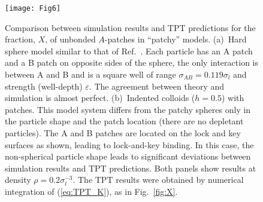 \documentclass[10pt,onside,singlecolumn]{article}
\begin{document}
\begin{figure} 
  \texttt{[image: Fig6]}
  \caption{Comparison between simulation results and TPT predictions for the fraction, $X$, of unbonded $A$-patches in
  ``patchy'' models.  (a)~Hard sphere 
  model similar to that of Ref.~\cite{Sciortino2007}. 
  Each particle has an A patch and a B patch on opposite sides of the sphere, 
  the only interaction is between A and B and is a square well of range $\sigma_{AB}=0.119\sigma_l$ and strength (well-depth) $\varepsilon$.
  The agreement between theory and simulation is almost perfect.  
  (b)~Indented colloids ($h=0.5$) with patches.  This model system
  differs from the patchy spheres only in the particle shape and the patch location (there are no depletant particles).
  The A and B patches are located on the lock and key surfaces as shown, leading to lock-and-key binding.
  In this case, the non-spherical particle shape leads to significant deviations between simulation results and TPT predictions.
  Both panels show results at density $\rho=0.2\sigma_l^{-3}$.  
  The TPT results were obtained by numerical integration of (\ref{eq:TPT_K}),
  as in Fig.~\ref{fig:X}.
  }
  \label{fig:patchyspheres}
\end{figure}
\end{document}
